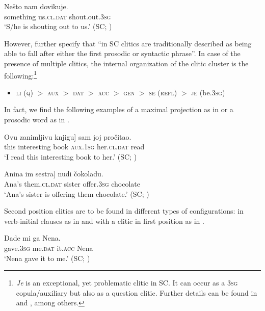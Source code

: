 \documentclass[output=paper,
colorlinks,
citecolor=brown,
newtxmath
]{langscibook}
\begin{document}
\ea\label{ex:18}
\gll Nešto     nam       dovikuje.\\
     something us.\textsc{cl.dat} shout.out.\textsc{3sg}\\
\glt `S/he is shouting out to us.'
\hfill (SC; \citealt[105]{Radanovic-Kocic1988})
\z

\noindent However, \citet[219]{Franks.King2000} further specify that ``in SC clitics are traditionally described as being able to fall after either the first prosodic or syntactic phrase''. In case of the presence of multiple clitics, the internal organization of the clitic cluster is the following:\footnote{\textit{Je} is an exceptional, yet problematic clitic in SC. It can occur as a \textsc{3sg} copula/auxiliary but also as a question clitic. Further details can be found in \citet{Franks2017} and \citet{Zivojinovicinpreparation}, among others.}

\begin{itemize}
\item \textsc{li} (\textsc{q}) $>$ \textsc{aux} $>$ \textsc{dat} $>$ \textsc{acc} $>$ \textsc{gen} $>$ \textsc{se} (\textsc{refl}) $>$ \textsc{je}
(be.\textsc{3sg})
\end{itemize}

\noindent In fact, we find the following examples of a maximal projection as in  or a prosodic word as in .


\ea\label{ex:19}
\gll\minsp{[} Ovu  zanimljivu  knjigu] sam      joj         pročitao.\\
    {} this  interesting book    \textsc{aux.1sg}  her.\textsc{cl.dat} read \\
\glt `I read this interesting book to her.'
\hfill (SC; \citealt[219]{Franks.King2000})
\z



\ea\label{ex:20}
\gll\minsp{[} Anina im          sestra] nudi      čokoladu.           \\
    {} Ana’s  them.\textsc{cl.dat} sister  offer.\textsc{3sg} chocolate \\
\glt `Ana’s sister is offering them chocolate.'
\hfill (SC; \citealt[414]{Progovac1996})
\z

\noindent Second position clitics are to be found in different types of configurations: in verb-initial clauses as in  and with a clitic in first position as in .


\ea\label{ex:21}
\gll Dade      mi      ga      Nena.           \\
     gave.\textsc{3sg} me.\textsc{dat}  it.\textsc{acc}  Nena \\
\glt `Nena gave it to me.'
\hfill (SC; \citealt[222]{Franks.King2000})
\z
\end{document}
